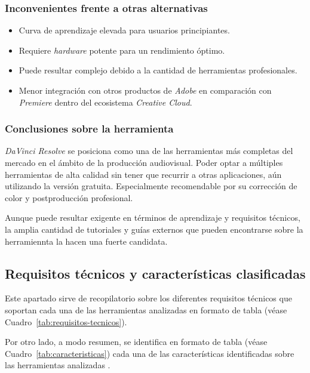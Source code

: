 \subsubsection{Inconvenientes frente a otras alternativas}

\begin{itemize}
    \item Curva de aprendizaje elevada para usuarios principiantes.
    \item Requiere \textit{hardware} potente para un rendimiento óptimo.
    \item Puede resultar complejo debido a la cantidad de herramientas profesionales.
    \item Menor integración con otros productos de \textit{Adobe} en comparación con \textit{Premiere} dentro del ecosistema \textit{Creative Cloud}.
\end{itemize}

\subsubsection{Conclusiones sobre la herramienta}

\textit{DaVinci Resolve} se posiciona como una de las herramientas más completas del mercado en el ámbito de la producción audiovisual. Poder optar a múltiples herramientas de alta calidad sin tener que recurrir a otras aplicaciones, aún utilizando la versión gratuita. Especialmente recomendable por su corrección de color y postproducción profesional.

Aunque puede resultar exigente en términos de aprendizaje y requisitos técnicos, la amplia cantidad de tutoriales y guías externos que pueden encontrarse sobre la herramiennta la hacen una fuerte candidata.

\subsection{Requisitos técnicos y características clasificadas}
Este apartado sirve de recopilatorio sobre los diferentes requisitos técnicos 
que soportan cada una de las herramientas analizadas en formato de tabla (véase Cuadro~\ref{tab:requisitos-tecnicos}).

Por otro lado, a modo resumen, se identifica en formato de tabla (véase Cuadro~\ref{tab:caracteristicas}) 
cada una de las características identificadas sobre las herramientas analizadas \cite{canva-requisitos} \cite{filmora-requirements} 
\cite{capcut-requirements-android} \cite{capcut-requirements-windows}.

